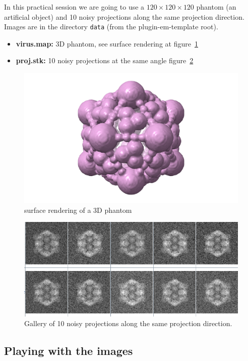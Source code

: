 \documentclass[12pt]{article} %
\newcommand{\ttt}[1]{\texttt{#1}}
\begin{document}
   In this practical session we are going to use a $120\times120\times120$ phantom (an artificial object) and 10 noisy projections along the same projection direction. Images are in the directory \ttt{data} (from the plugin-em-template root).
   
   \begin{itemize}
    \item {\bf virus.map:} 3D phantom, see surface rendering at figure~\ref{fig:rendering}
    \item {\bf proj.stk:} 10 noisy projections at the same angle figure~\ref{fig:proj}
   \end{itemize}

\begin{figure}[H]
\centering 
\includegraphics[scale=.2]{images/virus.png} 
\caption{surface rendering of a 3D phantom} 
\label{fig:rendering}
\end{figure}
\begin{figure}[H]
\centering 
\includegraphics[scale=1]{images/proj.png} 
\caption{Gallery of 10 noisy projections along the same projection direction.} 
\label{fig:proj}
\end{figure}

\subsection{Playing with the images}
\end{document}
